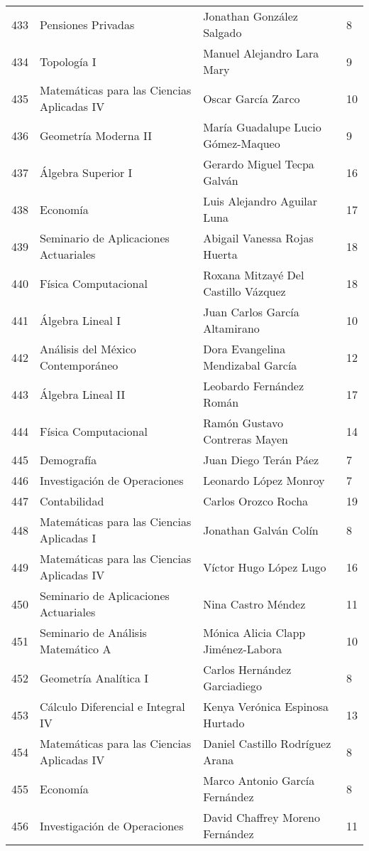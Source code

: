 \begin{table}[ht]
\begin{tabular}{rlll}
  433 & Pensiones Privadas & Jonathan González Salgado & 8 \\ 
  434 & Topología I & Manuel Alejandro Lara Mary & 9 \\ 
  435 & Matemáticas para las Ciencias Aplicadas IV & Oscar García Zarco & 10 \\ 
  436 & Geometría Moderna II & María Guadalupe Lucio Gómez-Maqueo & 9 \\ 
  437 & Álgebra Superior I & Gerardo Miguel Tecpa Galván & 16 \\ 
  438 & Economía & Luis Alejandro Aguilar Luna & 17 \\ 
  439 & Seminario de Aplicaciones Actuariales & Abigail Vanessa Rojas Huerta & 18 \\ 
  440 & Física Computacional & Roxana Mitzayé Del Castillo Vázquez & 18 \\ 
  441 & Álgebra Lineal I & Juan Carlos García Altamirano & 10 \\ 
  442 & Análisis del México Contemporáneo & Dora Evangelina Mendizabal García & 12 \\ 
  443 & Álgebra Lineal II & Leobardo Fernández Román & 17 \\ 
  444 & Física Computacional & Ramón Gustavo Contreras Mayen & 14 \\ 
  445 & Demografía & Juan Diego Terán Páez & 7 \\ 
  446 & Investigación de Operaciones & Leonardo López Monroy & 7 \\ 
  447 & Contabilidad & Carlos Orozco Rocha & 19 \\ 
  448 & Matemáticas para las Ciencias Aplicadas I & Jonathan Galván Colín & 8 \\ 
  449 & Matemáticas para las Ciencias Aplicadas IV & Víctor Hugo López Lugo & 16 \\ 
  450 & Seminario de Aplicaciones Actuariales & Nina Castro Méndez & 11 \\ 
  451 & Seminario de Análisis Matemático A & Mónica Alicia Clapp Jiménez-Labora & 10 \\ 
  452 & Geometría Analítica I & Carlos Hernández Garciadiego & 8 \\ 
  453 & Cálculo Diferencial e Integral IV & Kenya Verónica Espinosa Hurtado & 13 \\ 
  454 & Matemáticas para las Ciencias Aplicadas IV & Daniel Castillo Rodríguez Arana & 8 \\ 
  455 & Economía & Marco Antonio García Fernández & 8 \\ 
  456 & Investigación de Operaciones & David Chaffrey Moreno Fernández & 11 \\ 

\end{tabular}
\end{table}
